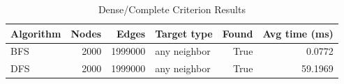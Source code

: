 \begin{table}[H]
\centering
\caption{Dense/Complete Criterion Results}
\begin{tabular}{lrrlrr}
\toprule
Algorithm & Nodes & Edges & Target type & Found & Avg time (ms)\\
\midrule
BFS & 2000 & 1999000 & any neighbor & True & 0.0772\\
DFS & 2000 & 1999000 & any neighbor & True & 59.1969\\
\bottomrule
\end{tabular}
\end{table}
